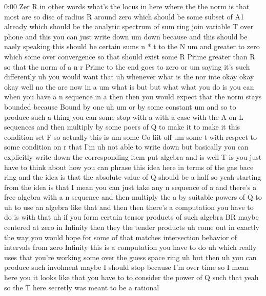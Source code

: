 \begin{unfinished}{0:00}
Zer  R  in  other  words  what's  the  locus  in
here  where  the  the  norm  is  that  most
are
so  disc  of  radius  R  around
zero  which  should  be  some  subset  of  A1
already  which  should  be  the  analytic
spectrum  of  sum
ring  join  variable  T  over
phone  and  this  you  can  just  write  down
um
down  because  and  this  should  be  naely
speaking  this  should  be  certain
sums  n  *  t  to  the
N  um  and  greater  to
zero  which  some  over  convergence  so  that
should  exist  some  R  Prime  greater  than  R
so  that  the  norm  of  a  n  r  Prime  to  the
end  goes  to
zero
or
um  saying  it's  such  differently  uh  you
would  want
that  uh
whenever  what  is  the
nor  inte  okay  okay  okay  well  no  the  are
now  in  a
um  what  is  but  but  what  what  you  do  is
you  can  when  you  have  a  n  sequence  in  a
then  then  you  would  expect  that  the  norm
stays  bounded  because  Bound  by  one  uh  um
or  by  some  constant  um  and  so  to  produce
such  a  thing  you  can  some  stop  with
a  with  a  case  with  the  A  on  L  sequences
and  then  multiply  by  some  poers  of  Q  to
make  it  to  make  it  this  condition  set  F
so  actually  this
is
um  some  Co  liit
off
um  some  t  with  respect  to  some  condition
on  r  that  I'm  uh  not  able  to  write  down
but  basically  you  can  explicitly  write
down  the  corresponding  item  put  algebra
and
is  well  T  is  you  just  have  to  think
about  how  you  can  phrase  this  idea  here
in  terms  of  the  gas  bace  ring  and  the
idea  is  that  the  absolute  value  of  Q
should  be  a  half  so  yeah  starting  from
the  idea  is  that  I  mean  you  can  just
take  any  n  sequence  of  a  and  there's  a
free  algebra  with  a  n  sequence  and  then
multiply  the  a  by  suitable  powers  of  Q
to  uh  to  use  an  algebra  like  that  and
then  then  there's  a  computation  you  have
to  do  is  with  that
uh  if  you  form  certain  tensor  products
of  such  algebra  BR  maybe  centered  at
zero  in  Infinity  then  they  the  tender
products  uh  come  out  in  exactly  the  way
you  would  hope  for  some  of  that  matches
intersection  behavior  of  intervals  from
zero
Infinity  this  is  a  computation  you  have
to  do  uh  which  really  uses  that  you're
working  some  over  the  guess  space  ring
uh  but  then  uh  you  can  produce  such
involment  maybe  I  should  stop  because
I'm  over
time  so  I  mean  here  you  it  looks  like
that  you  have  to  to  consider  the  power
of  Q  such  that  yeah  so  the  T  here
secretly  was  meant  to  be  a  rational

\end{unfinished}
